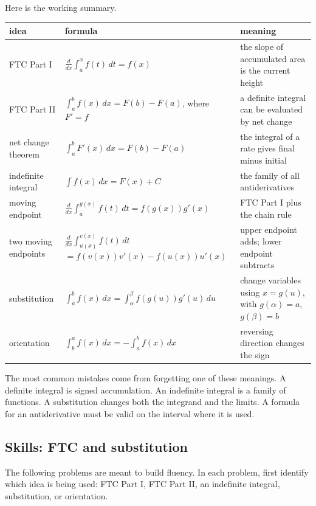 Here is the working summary.

\begin{center}
\begin{tabular}{p{}|p{}|p{}}
\textbf{idea} & \textbf{formula} & \textbf{meaning} \\ \hline
FTC Part I
&
\(\displaystyle \frac{d}{dx}\int_a^x f(t)\,dt=f(x)\)
&
the slope of accumulated area is the current height
\\[4mm] \hline
FTC Part II
&
\(\displaystyle \int_a^b f(x)\,dx=F(b)-F(a)\), where \(F'=f\)
&
a definite integral can be evaluated by net change
\\[4mm] \hline
net change theorem
&
\(\displaystyle \int_a^b F'(x)\,dx=F(b)-F(a)\)
&
the integral of a rate gives final minus initial
\\[4mm] \hline
indefinite integral
&
\(\displaystyle \int f(x)\,dx=F(x)+C\)
&
the family of all antiderivatives
\\[4mm] \hline
moving endpoint
&
\(\displaystyle \frac{d}{dx}\int_a^{g(x)} f(t)\,dt=f(g(x))g'(x)\)
&
FTC Part I plus the chain rule
\\[4mm] \hline
two moving endpoints
&
\(\displaystyle \frac{d}{dx}\int_{u(x)}^{v(x)} f(t)\,dt\) \newline
\(=f(v(x))v'(x)-f(u(x))u'(x)\)
&
upper endpoint adds; lower endpoint subtracts
\\[4mm] \hline
substitution
&
\(\displaystyle \int_a^b f(x)\,dx
=\int_\alpha^\beta f(g(u))g'(u)\,du\)
&
change variables using \(x=g(u)\), with \(g(\alpha)=a\), \(g(\beta)=b\)
\\[4mm] \hline
orientation
&
\(\displaystyle \int_b^a f(x)\,dx=-\int_a^b f(x)\,dx\)
&
reversing direction changes the sign
\end{tabular}
\end{center}

The most common mistakes come from forgetting one of these meanings.  A definite
integral is signed accumulation.  An indefinite integral is a family of functions.  A
substitution changes both the integrand and the limits.  A formula for an
antiderivative must be valid on the interval where it is used.

\subsection{Skills: FTC and substitution}
\label{subsec:skills-ftc-substitution}

The following problems are meant to build fluency.  In each problem, first identify
which idea is being used: FTC Part I, FTC Part II, an indefinite integral, substitution,
or orientation.


